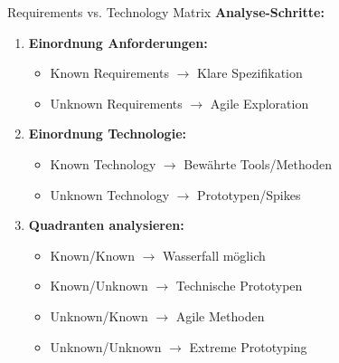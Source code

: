 \begin{KR}{Requirements vs. Technology Matrix}
\textbf{Analyse-Schritte:}
\begin{enumerate}
    \item \textbf{Einordnung Anforderungen:}
    \begin{itemize}
        \item Known Requirements $\rightarrow$ Klare Spezifikation
        \item Unknown Requirements $\rightarrow$ Agile Exploration
    \end{itemize}
    
    \item \textbf{Einordnung Technologie:}
    \begin{itemize}
        \item Known Technology $\rightarrow$ Bewährte Tools/Methoden
        \item Unknown Technology $\rightarrow$ Prototypen/Spikes
    \end{itemize}
    
    \item \textbf{Quadranten analysieren:}
    \begin{itemize}
        \item Known/Known $\rightarrow$ Wasserfall möglich
        \item Known/Unknown $\rightarrow$ Technische Prototypen
        \item Unknown/Known $\rightarrow$ Agile Methoden
        \item Unknown/Unknown $\rightarrow$ Extreme Prototyping
    \end{itemize}
\end{enumerate}
\end{KR}

